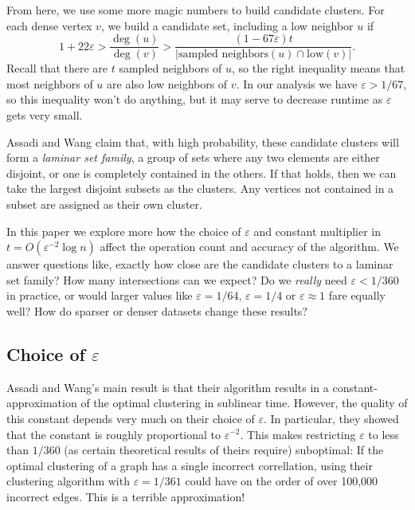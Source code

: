 \documentclass[
]{article}
\begin{document}
From here, we use some more magic numbers to build candidate clusters.
For each dense vertex {\(v\)}, we build a candidate set, including a low
neighbor {\(u\)} if
{\[1 + 22\varepsilon > \frac{\deg(u)}{\deg(v)} > \frac{(1 - 67\varepsilon)t}{|\text{sampled\ neighbors}(u) \cap \text{low}(v)|}.\]}Recall
that there are {\(t\)} sampled neighbors of {\(u\)}, so the right
inequality means that most neighbors of {\(u\)} are also low neighbors
of {\(v\)}. In our analysis we have {\(\varepsilon > 1/67\)}, so
this inequality won't do anything, but it may serve to
decrease runtime as {\(\varepsilon\)} gets very small.

Assadi and Wang claim that, with high probability, these candidate clusters will form a \emph{laminar set family}, a group of sets where any two elements are either disjoint, or one is completely contained in the others. If that holds, then we can take the largest disjoint subsets as the clusters. Any vertices not contained in a subset are assigned as their own cluster.

In this paper we explore more how the choice of {\(\varepsilon\)} and
constant multiplier in {\(t = O(\varepsilon^{- 2}\log n)\)} affect the
operation count and accuracy of the algorithm. We answer questions like,
exactly how close are the candidate clusters to a laminar set family?
How many intersections can we expect? Do we \emph{really} need
{\(\varepsilon < 1/360\)} in practice, or would larger values like
{\(\varepsilon = 1/64\)}, {\(\varepsilon = 1/4\)} or
{\(\varepsilon \approx 1\)} fare equally well? How do sparser or denser
datasets change these results?

\hypertarget{choice-of-varepsilon}{%
\subsection{\texorpdfstring{Choice of
{\(\varepsilon\)}}{Choice of \textbackslash varepsilon}}\label{choice-of-varepsilon}}

Assadi and Wang's main result is that their algorithm
results in a constant-approximation of the optimal clustering in
sublinear time. However, the quality of this constant depends very much
on their choice of {\(\varepsilon\)}. In particular, they showed that
the constant is roughly proportional to {\(\varepsilon^{- 2}\)}. This
makes restricting {\(\varepsilon\)} to less than {\(1/360\)} (as certain
theoretical results of theirs require) suboptimal: If the optimal
clustering of a graph has a single incorrect correllation, using their
clustering algorithm with {\(\varepsilon = 1/361\)} could have on the
order of over 100,000 incorrect edges. This is a terrible approximation!
\end{document}
